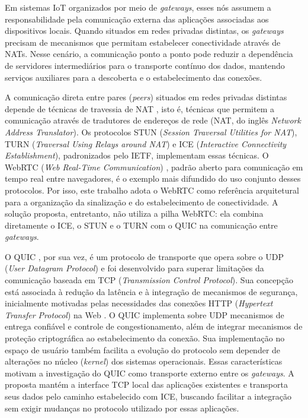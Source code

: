 Em sistemas IoT organizados por meio de \textit{gateways}, esses nós assumem a responsabilidade pela comunicação externa das aplicações associadas aos dispositivos locais. Quando situados em redes privadas distintas, os \textit{gateways} precisam de mecanismos que permitam estabelecer conectividade através de NATs. Nesse cenário, a comunicação ponto a ponto pode reduzir a dependência de servidores intermediários para o transporte contínuo dos dados, mantendo serviços auxiliares para a descoberta e o estabelecimento das conexões.

A comunicação direta entre pares (\textit{peers}) situados em redes privadas distintas depende de técnicas de travessia de NAT \citep{rfc5128}, isto é, técnicas que permitem a comunicação através de tradutores de endereços de rede (NAT, do inglês \textit{Network Address Translator}). Os protocolos STUN (\textit{Session Traversal Utilities for NAT}), TURN (\textit{Traversal Using Relays around NAT}) e ICE (\textit{Interactive Connectivity Establishment}), padronizados pelo IETF, implementam essas técnicas. O WebRTC (\textit{Web Real-Time Communication}) \citep{WebRTCForTheCurious}, padrão aberto para comunicação em tempo real entre navegadores, é o exemplo mais difundido do uso conjunto desses protocolos. Por isso, este trabalho adota o WebRTC como referência arquitetural para a organização da sinalização e do estabelecimento de conectividade. A solução proposta, entretanto, não utiliza a pilha WebRTC: ela combina diretamente o ICE, o STUN e o TURN com o QUIC na comunicação entre \textit{gateways}.

O QUIC \citep{rfc9000}, por sua vez, é um protocolo de transporte que opera sobre o UDP (\textit{User Datagram Protocol}) e foi desenvolvido para superar limitações da comunicação baseada em TCP (\textit{Transmission Control Protocol}). Sua concepção está associada à redução da latência e à integração de mecanismos de segurança, inicialmente motivadas pelas necessidades das conexões HTTP (\textit{Hypertext Transfer Protocol}) na Web \citep{marx2020quic}. O QUIC implementa sobre UDP mecanismos de entrega confiável e controle de congestionamento, além de integrar mecanismos de proteção criptográfica ao estabelecimento da conexão. Sua implementação no espaço de usuário também facilita a evolução do protocolo sem depender de alterações no núcleo (\textit{kernel}) dos sistemas operacionais. Essas características motivam a investigação do QUIC como transporte externo entre os \textit{gateways}. A proposta mantém a interface TCP local das aplicações existentes e transporta seus dados pelo caminho estabelecido com ICE, buscando facilitar a integração sem exigir mudanças no protocolo utilizado por essas aplicações.

